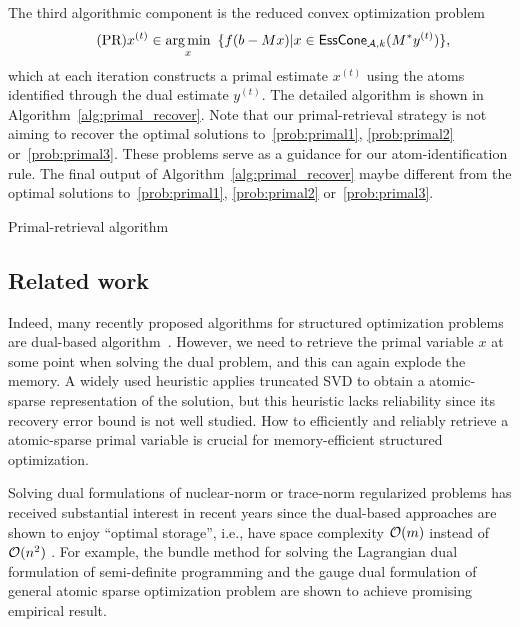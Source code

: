 The third algorithmic component is the reduced convex optimization problem
\begin{equation} \label{eq:primal_recover} \tag{PR}
    x^{(t)} \in \underset{x}{\textrm{arg}\,{\min}}\enskip\{ f(b - Mx) | x \in \operatorname{\sf EssCone}_{\mathcal{A}, k}(M^*y^{(t)})\},
\end{equation}
which at each iteration constructs a primal estimate $x^{(t)}$ using the atoms identified through the dual estimate $y^{(t)}$.  The detailed algorithm is shown in Algorithm~\ref{alg:primal_recover}. Note that our primal-retrieval strategy is not aiming to recover the optimal solutions to~\eqref{prob:primal1}, \eqref{prob:primal2} or~\eqref{prob:primal3}. These problems serve as a guidance for our atom-identification rule. The final output of Algorithm~\ref{alg:primal_recover} maybe different from the optimal solutions to~\eqref{prob:primal1}, \eqref{prob:primal2} or~\eqref{prob:primal3}.

\begin{algorithm}[t]
    \DontPrintSemicolon\setcounter{AlgoLine}{-1}
    \caption{Primal-retrieval algorithm} 
    \label{alg:primal_recover}
\end{algorithm}


\subsection{Related work}

Indeed, many recently proposed algorithms for structured optimization problems are dual-based algorithm~\cite{fan2019bundle,DingYCTU21}.  However, we need to retrieve the primal variable $x$ at some point when solving the dual problem, and this can again explode the memory. A widely used heuristic applies truncated SVD \cite[Algorithm~6.4]{fan2019alignment} to obtain a atomic-sparse representation of the solution, but this heuristic lacks reliability since its recovery error bound is not well studied. How to efficiently and reliably retrieve a atomic-sparse primal variable is crucial for memory-efficient structured optimization.

Solving dual formulations of nuclear-norm or trace-norm regularized problems has received substantial interest in recent years since the dual-based approaches are shown to enjoy ``optimal storage'', i.e., have space complexity $\mathcal{O}(m)$ instead of $\mathcal{O}( n^2 )$ \cite{DingYCTU21}. For example, the bundle method for solving the Lagrangian dual formulation of semi-definite programming \cite{helmberg2000spectral} and the gauge dual formulation of general atomic sparse optimization problem \cite{fan2019bundle} are shown to achieve promising empirical result.

